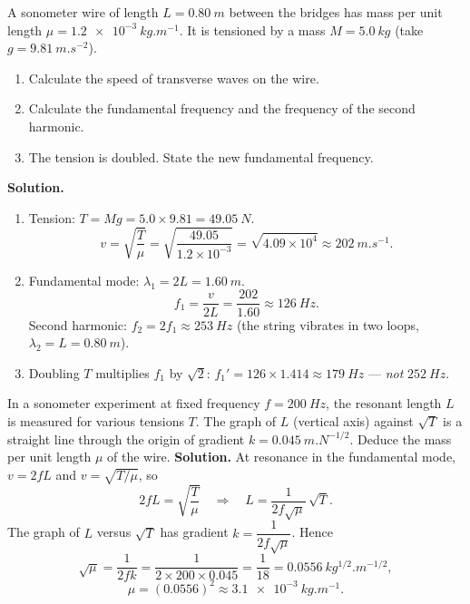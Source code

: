 \documentclass[11pt]{article}
\begin{document}
\begin{exoresolu}
A sonometer wire of length $L = \SI{0.80}{m}$ between the bridges has mass per unit length $\mu = \SI{1.2e-3}{kg.m^{-1}}$. It is tensioned by a mass $M = \SI{5.0}{kg}$ (take $g = \SI{9.81}{m.s^{-2}}$).
\begin{enumerate}
\item Calculate the speed of transverse waves on the wire.
\item Calculate the fundamental frequency and the frequency of the second harmonic.
\item The tension is doubled. State the new fundamental frequency.
\end{enumerate}
\tcblower
\textbf{Solution.}
\begin{enumerate}
\item Tension: $T = Mg = 5.0 \times 9.81 = \SI{49.05}{N}$.
\[ v = \sqrt{\frac{T}{\mu}} = \sqrt{\frac{49.05}{1.2\times10^{-3}}} = \sqrt{4.09\times10^{4}} \approx \SI{202}{m.s^{-1}}. \]
\item Fundamental mode: $\lambda_1 = 2L = \SI{1.60}{m}$.
\[ f_1 = \frac{v}{2L} = \frac{202}{1.60} \approx \SI{126}{Hz}. \]
Second harmonic: $f_2 = 2f_1 \approx \SI{253}{Hz}$ (the string vibrates in two loops, $\lambda_2 = L = \SI{0.80}{m}$).
\item Doubling $T$ multiplies $f_1$ by $\sqrt{2}$: $f_1' = 126 \times 1.414 \approx \SI{179}{Hz}$ --- \emph{not} $\SI{252}{Hz}$.
\end{enumerate}
\end{exoresolu}

\begin{exoresolu}
In a sonometer experiment at fixed frequency $f = \SI{200}{Hz}$, the resonant length $L$ is measured for various tensions $T$. The graph of $L$ (vertical axis) against $\sqrt{T}$ is a straight line through the origin of gradient $k = \SI{0.045}{m.N^{-1/2}}$. Deduce the mass per unit length $\mu$ of the wire.
\tcblower
\textbf{Solution.} At resonance in the fundamental mode, $v = 2fL$ and $v = \sqrt{T/\mu}$, so
\[ 2fL = \sqrt{\frac{T}{\mu}} \quad\Longrightarrow\quad L = \frac{1}{2f\sqrt{\mu}}\,\sqrt{T}. \]
The graph of $L$ versus $\sqrt{T}$ has gradient $k = \dfrac{1}{2f\sqrt{\mu}}$. Hence
\[ \sqrt{\mu} = \frac{1}{2fk} = \frac{1}{2 \times 200 \times 0.045} = \frac{1}{18} = \SI{0.0556}{kg^{1/2}.m^{-1/2}}, \]
\[ \mu = (0.0556)^2 \approx \SI{3.1e-3}{kg.m^{-1}}. \]
\end{exoresolu}
\end{document}
